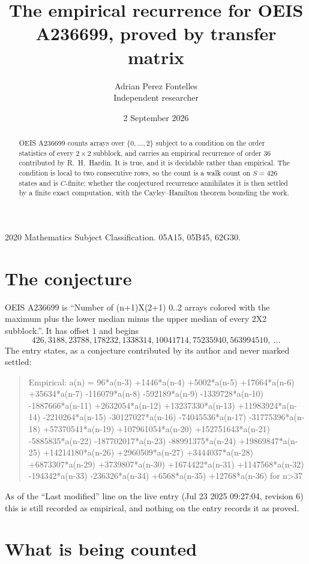 \documentclass[11pt,a4paper]{article}
\title{The empirical recurrence for OEIS A236699, proved by transfer matrix}
\author{Adrian Perez Fontelles\\ \small Independent researcher}
\date{2 September 2026}
\theoremstyle{plain}
\theoremstyle{definition}
\begin{document}
\maketitle

\begin{abstract}
OEIS A236699 counts arrays over $\{0,\dots,2\}$ subject to a condition on the order
statistics of every $2\times2$ subblock, and carries an empirical recurrence of order
$36$ contributed by R.~H.~Hardin. It is true, and it is decidable rather than empirical.
The condition is local to two consecutive rows, so the count is a walk count on $S=426$
states and is $C$-finite; whether the conjectured recurrence annihilates it is then settled by
a finite exact computation, with the Cayley--Hamilton theorem bounding the work.
\end{abstract}

\noindent\small 2020 Mathematics Subject Classification. 05A15, 05B45, 62G30.\normalsize

\section{The conjecture}

OEIS A236699 is ``Number of (n+1)X(2+1) 0..2 arrays colored with the maximum plus the lower median minus the upper median of every 2X2 subblock.''. It has offset $1$ and begins
\[
426, 3188, 23788, 178232, 1338314, 10041714, 75235940, 563994510,\ \dots
\]
The entry states, as a conjecture contributed by its author and never marked settled:
\begin{quote}
Empirical: a(n) = 96*a(n-3) +1446*a(n-4) +5002*a(n-5) +17664*a(n-6) +35634*a(n-7) -116079*a(n-8) -592189*a(n-9) -1339728*a(n-10) -1887666*a(n-11) +2632054*a(n-12) +13237330*a(n-13) +11983924*a(n-14) -2210264*a(n-15) -30127027*a(n-16) -74045536*a(n-17) -31775396*a(n-18) +57370541*a(n-19) +107961054*a(n-20) +152751643*a(n-21) -5885835*a(n-22) -187702017*a(n-23) -88991375*a(n-24) +19869847*a(n-25) +14214180*a(n-26) +2960509*a(n-27) +3444037*a(n-28) +6873307*a(n-29) +3739807*a(n-30) +1674422*a(n-31) +1147568*a(n-32) -194342*a(n-33) -236326*a(n-34) +6568*a(n-35) +12768*a(n-36) for n>37
\end{quote}
As of the ``Last modified'' line on the live entry (Jul 23 2025 09:27:04, revision 6) this is still
recorded as empirical, and nothing on the entry records it as proved.

\section{What is being counted}
\end{document}

